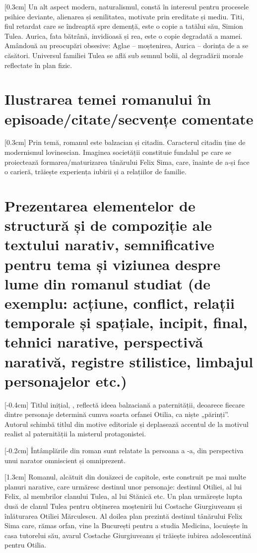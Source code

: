 [0.3cm]
Un alt aspect modern, naturalismul, constă în interesul pentru procesele psihice deviante, alienarea și senilitatea, motivate prin ereditate și mediu. Titi, fiul retardat care se îndreaptă spre demență, este o copie a tatălui său, Simion Tulea. Aurica, fata bătrână, invidioasă și rea, este o copie degradată a mamei. Amândouă au preocupări obsesive: Aglae -- moștenirea, Aurica -- dorința de a se căsători. Universul familiei Tulea se află sub semnul bolii, al degradării morale reflectate în plan fizic.


\section{Ilustrarea temei romanului în episoade/citate/secvențe comentate}

[0.3cm]
Prin temă, romanul este balzacian și citadin. Caracterul citadin ține de modernismul lovinescian. Imaginea societății constituie fundalul pe care se proiectează formarea/maturizarea tânărului Felix Sima, care, înainte de a-și face o carieră, trăiește experiența iubirii și a relațiilor de familie.


\section{Prezentarea elementelor de structură și de compoziție ale textului narativ, semnificative pentru tema și viziunea despre lume din romanul studiat {\footnotesize\normalfont(de exemplu: acțiune, conflict, relații temporale și spațiale, incipit, final, tehnici narative, perspectivă narativă, registre stilistice, limbajul personajelor etc.)}}

[-0.4cm]
Titlul inițial, , reflectă ideea balzaciană a paternității, deoarece fiecare dintre personaje determină cumva soarta orfanei Otilia, ca niște „părinți”. Autorul schimbă titlul din motive editoriale și deplasează accentul de la motivul realist al paternității la misterul protagonistei.

[-0.2cm]
Întâmplările din roman sunt relatate la persoana a -a, din perspectiva unui narator omniscient și omniprezent.

[1.3cm]
Romanul, alcătuit din douăzeci de capitole, este construit pe mai multe planuri narative, care urmăresc destinul unor personaje: destinul Otiliei, al lui Felix, al membrilor clanului Tulea, al lui Stănică etc. Un plan urmărește lupta dusă de clanul Tulea pentru obținerea moștenirii lui Costache Giurgiuveanu și înlăturarea Otiliei Mărculescu. Al doilea plan prezintă destinul tânărului Felix Sima care, rămas orfan, vine la București pentru a studia Medicina, locuiește în casa tutorelui său, avarul Costache Giurgiuveanu și trăiește iubirea adolescentină pentru Otilia.

